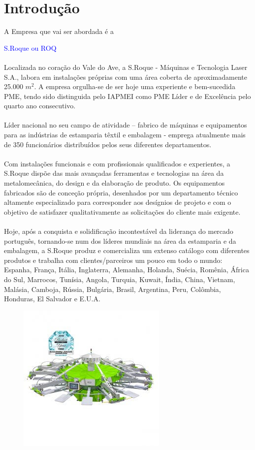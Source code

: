 \section{Introdução}
\qquad A Empresa que vai ser abordada é a {\textcolor{blue}{S.Roque ou ROQ}\\
\\
Localizada no coração do Vale do Ave, a S.Roque - Máquinas e Tecnologia Laser S.A., labora em instalações próprias com uma área coberta de aproximadamente 25.000 $m^{2}$. A empresa orgulha-se de ser hoje uma experiente e bem-sucedida PME, tendo sido distinguida pelo IAPMEI como PME Líder e de Excelência pelo quarto ano consecutivo.\\\
\\
Líder nacional no seu campo de atividade – fabrico de máquinas e equipamentos para as indústrias de estamparia têxtil e embalagem - emprega atualmente mais de 350 funcionários distribuídos pelos seus diferentes departamentos.\\
\\
Com instalações funcionais e com profissionais qualificados e experientes, a S.Roque dispõe das mais avançadas ferramentas e tecnologias na área da metalomecânica, do design e da elaboração de produto. Os equipamentos fabricados são de conceção própria, desenhados por um departamento técnico altamente especializado para corresponder aos desígnios de projeto e com o objetivo de satisfazer qualitativamente as solicitações do cliente mais exigente.\\
\\
Hoje, após a conquista e solidificação incontestável da liderança do mercado português, tornando-se num dos líderes mundiais na área da estamparia e da embalagem, a S.Roque produz e comercializa um extenso catálogo com diferentes produtos e trabalha com clientes/parceiros um pouco em todo o mundo: Espanha, França, Itália, Inglaterra, Alemanha, Holanda, Suécia, Romênia, África do Sul, Marrocos, Tunísia, Angola, Turquia, Kuwait, Índia, China, Vietnam, Malásia, Camboja, Rússia, Bulgária, Brasil, Argentina, Peru, Colômbia, Honduras, El Salvador e E.U.A.
\begin{figure}[ht]
\begin{center}
\includegraphics[scale=0.5]{"./image/ROQ/maquinas/ECO-P18_600x600-2-275x275.jpg"}

\end{center}
\end{figure}}
